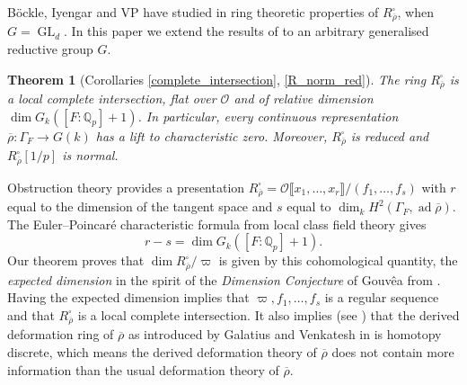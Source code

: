 \documentclass{amsart}
\newtheorem{thm}[prop]{Theorem}
\theoremstyle{definition}
\theoremstyle{remark}
\DeclareMathOperator{\GL}{GL}
\newcommand{\Qp}{\mathbb {Q}_p}
\newcommand{\OO}{\mathcal O}
\DeclareMathOperator{\ad}{ad}
\newcommand{\br}[1]{\llbracket #1\rrbracket}
\newcommand{\rhobar}{\overline{\rho}}
\begin{document}
B\"ockle, Iyengar and VP have studied in \cite{BIP_new} ring theoretic 
properties of $R^{\square}_{\rhobar}$, when $G=\GL_d$. In this paper 
we extend the results of \cite{BIP_new} to an arbitrary generalised
reductive group $G$.




\begin{thm}[Corollaries \ref{complete_intersection}, \ref{R_norm_red}]\label{thm_intro-1}
The ring $R^{\square}_{\rhobar}$ is a local complete intersection, flat over $\OO$ and of relative dimension $\dim G_k ([F:\Qp]+1)$. In particular, every continuous representation $\rhobar: \Gamma_F\rightarrow G(k)$ has a lift to characteristic zero. Moreover, $R^{\square}_{\rhobar}$ is reduced and $R^{\square}_{\rhobar}[1/p]$ is normal. 
\end{thm}

Obstruction theory provides a presentation $R^\square_{\rhobar} = \OO\br{x_1,\dots,x_r}/(f_1, \ldots, f_s)$ with $r$ equal to the dimension of the tangent space and $s$ equal to $\dim_k H^2(\Gamma_F, \ad\rhobar)$.
The Euler--Poincar\'e characteristic formula from local class field theory gives
    \begin{equation}\label{EP_bound}
    r-s=\dim G_k ([F:\Qp]+1).
    \end{equation}
Our theorem proves that $\dim R^\square_{\rhobar}/\varpi$ is given by this cohomological quantity, the \emph{expected dimension} in the spirit of the \emph{Dimension Conjecture} of Gouv\^{e}a from \cite[Lecture 4]{Gouvea}. Having the expected dimension implies that $\varpi,f_1, \ldots, f_s$ is a regular sequence and that $R^\square_{\rhobar}$ is a local complete intersection. It also implies
(see \cite[Lemma 7.5]{DDR_GV}) that the derived deformation ring of $\rhobar$ as introduced 
by Galatius and Venkatesh in \cite{DDR_GV} 
is homotopy discrete, which means the derived deformation theory 
of $\rhobar$ does not contain more information than
the usual deformation 
theory of $\rhobar$. 
\end{document}
